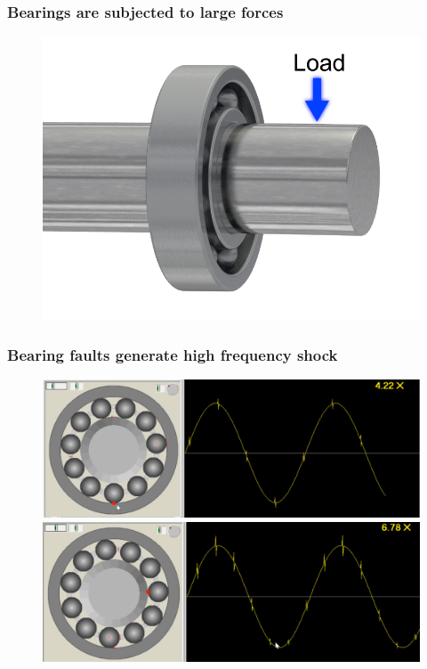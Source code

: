 \documentclass{beamer}
\begin{document}



\begin{frame}
	\frametitle{Bearings are subjected to large forces}
	\begin{figure}[H]
		\centering
		\includegraphics[width=0.8\linewidth]{bearing}
	\end{figure}
\end{frame}



\begin{frame}
	\frametitle{Bearing faults generate high frequency shock}
	\begin{figure}[H]
		\centering
		\includegraphics[width=0.8\linewidth]{outer-race1}
		\includegraphics[width=0.8\linewidth]{inner-race1}
	\end{figure}
\end{frame}
\end{document}
